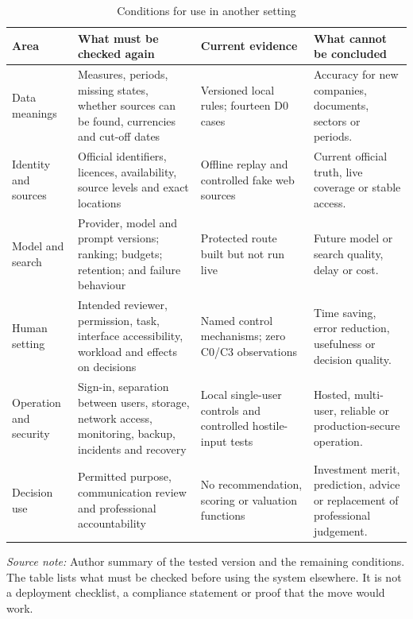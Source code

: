\clearpage
\begin{table}[p]
  \centering
  \scriptsize
  \setlength{\tabcolsep}{4pt}
  \renewcommand{\arraystretch}{1.10}
  \begin{tabularx}{\textwidth}{@{}P{0.20\textwidth}P{0.29\textwidth}P{0.25\textwidth}Y@{}}
    \toprule
    \textbf{Area} & \textbf{What must be checked again} & \textbf{Current evidence} & \textbf{What cannot be concluded} \\
    \midrule
    Data meanings & Measures, periods, missing states, whether sources can be found, currencies and cut-off dates & Versioned local rules; fourteen D0 cases & Accuracy for new companies, documents, sectors or periods. \\
    Identity and sources & Official identifiers, licences, availability, source levels and exact locations & Offline replay and controlled fake web sources & Current official truth, live coverage or stable access. \\
    Model and search & Provider, model and prompt versions; ranking; budgets; retention; and failure behaviour & Protected route built but not run live & Future model or search quality, delay or cost. \\
    Human setting & Intended reviewer, permission, task, interface accessibility, workload and effects on decisions & Named control mechanisms; zero C0/C3 observations & Time saving, error reduction, usefulness or decision quality. \\
    Operation and security & Sign-in, separation between users, storage, network access, monitoring, backup, incidents and recovery & Local single-user controls and controlled hostile-input tests & Hosted, multi-user, reliable or production-secure operation. \\
    Decision use & Permitted purpose, communication review and professional accountability & No recommendation, scoring or valuation functions & Investment merit, prediction, advice or replacement of professional judgement. \\
    \bottomrule
  \end{tabularx}

  \caption{Conditions for use in another setting}
  \label{tab:disc-transfer-conditions}

  \vspace{4pt}
  \parbox{\textwidth}{\scriptsize
    \textit{Source note:} Author summary of the tested version and the remaining conditions. The
    table lists what must be checked before using the system elsewhere. It is not a deployment
    checklist, a compliance statement or proof that the move would work.}
\end{table}
\clearpage
